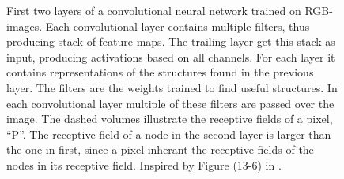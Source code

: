 \begin{figure}
    \caption[Receptive field of pixel in convolutional neural network trained on RGB-image.]{First two layers of a convolutional neural network trained on RGB-images. Each convolutional layer contains multiple filters, thus producing stack of feature maps. The trailing layer get this stack as input, producing activations based on all channels. For each layer it contains representations of the structures found in the previous layer. The filters are the weights trained to find useful structures. In each convolutional layer multiple of these filters are passed over the image. The dashed volumes illustrate the receptive fields of a pixel, ``P''. The receptive field of a node in the second layer is larger than the one in first, since a pixel inherant the receptive fields of the nodes in its receptive field. Inspired by Figure (13-6) in \cite{OReiley_book}.
    }
    \label{fig:conv_layers}
\end{figure} 
 